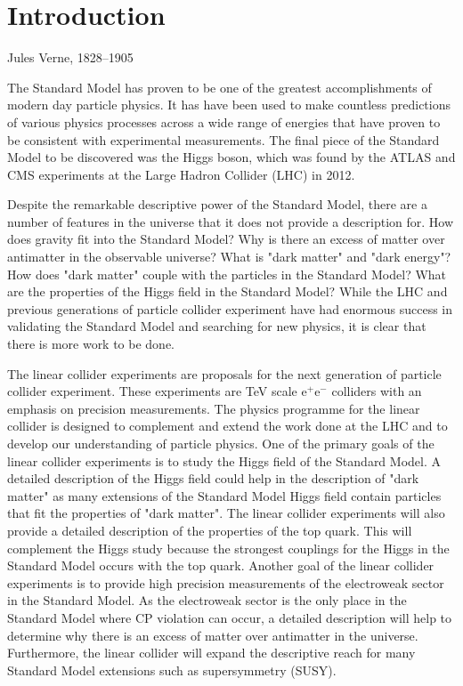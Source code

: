 \chapter{Introduction}
\label{chap:introduction}

{Jules Verne, 1828--1905}


The Standard Model has proven to be one of the greatest accomplishments of modern day particle physics.  It has have been used to make countless predictions of various physics processes across a wide range of energies that have proven to be consistent with experimental measurements.  The final piece of the Standard Model to be discovered was the Higgs boson, which was found by the ATLAS \cite{Aad:2012tfa} and CMS \cite{Chatrchyan:2012xdj} experiments at the Large Hadron Collider (LHC) in 2012.  

Despite the remarkable descriptive power of the Standard Model, there are a number of features in the universe that it does not provide a description for.  How does gravity fit into the Standard Model?  Why is there an excess of matter over antimatter in the observable universe?  What is "dark matter" and "dark energy"?  How does "dark matter" couple with the particles in the Standard Model?  What are the properties of the Higgs field in the Standard Model?  While the LHC and previous generations of particle collider experiment have had enormous success in validating the Standard Model and searching for new physics, it is clear that there is more work to be done. 

The linear collider experiments are proposals for the next generation of particle collider experiment.  These experiments are TeV scale $\text{e}^{+}\text{e}^{-}$ colliders with an emphasis on precision measurements.  The physics programme for the linear collider is designed to complement and extend the work done at the LHC and to develop our understanding of particle physics.  One of the primary goals of the linear collider experiments is to study the Higgs field of the Standard Model.  A detailed description of the Higgs field could help in the description of "dark matter" as many extensions of the Standard Model Higgs field contain particles that fit the properties of "dark matter".  The linear collider experiments will also provide a detailed description of the properties of the top quark.  This will complement the Higgs study because the strongest couplings for the Higgs in the Standard Model occurs with the top quark.  Another goal of the linear collider experiments is to provide high precision measurements of the electroweak sector in the Standard Model.  As the electroweak sector is the only place in the Standard Model where CP violation can occur, a detailed description will help to determine why there is an excess of matter over antimatter in the universe.  Furthermore, the linear collider will expand the descriptive reach for many Standard Model extensions such as supersymmetry (SUSY).


